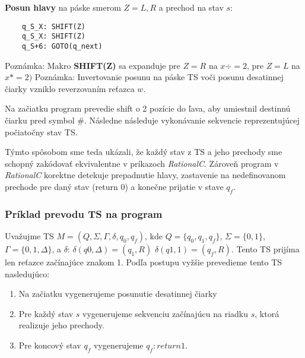 \documentclass[10pt]{article}
\begin{document}
    \textbf{Posun hlavy} na páske smerom $Z = {L,R}$ a prechod na stav $s$:
    \begin{verbatim}
    q_S_X: SHIFT(Z) 
    q_S_X: SHIFT(Z)  
    q_S+6: GOTO(q_next) 
    \end{verbatim}
    Poznámka: Makro \textbf{SHIFT(Z)} sa expanduje pre $Z = R$ na $x \div = 2$, pre $Z = L$ na $x *= 2)$ 
    Poznámka: Invertovanie posunu na páske TS voči posunu desatinnej čiarky vzniklo reverzovaním reťazca $w$.

    Na začiatku program prevedie shift o 2 pozície do ľava, aby umiestnil destinnú čiarku pred
    symbol $\#$. Následne následuje vykonávanie sekvencie reprezentujúcej počiatočny stav TS.

    Týmto spôsobom sme teda ukázali, že každý stav z TS a jeho prechody sme schopný zakódovať
    ekvivalentne v príkazoch \textit{RationalC}. 
    Zároveň program v \textit{RationalC} korektne detekuje prepadnutie hlavy, zastavenie na
    nedefinovanom prechode pre daný stav (return 0) a konečne prijatie v stave $q_f$.
    \subsubsection{Príklad prevodu TS na program}

    Uvažujme TS $M = (Q, \Sigma, \Gamma, \delta, q_0, q_f)$, kde $Q = \{q_0, q_1,q_f\}$, $\Sigma =
    \{0,1\}$, $\Gamma = \{0,1,\Delta\}$, a
    $\delta$: $\delta(q0, \Delta) = (q_1, R)$ $\delta(q1, 1) = (q_f, R)$.
    Tento TS prijíma len reťazce začínajúce znakom 1.
    Podľa postupu vyžšie prevedieme tento TS nasledujúco:
    \begin{enumerate}
        \item Na začiatku vygenerujeme posunutie desatinnej čiarky
        \item Pre každý stav $s$ vygenerujeme sekvenciu začínajúcu na riadku $s$, ktorá realizuje jeho prechody.
        \item Pre koncový stav $q_f$ vygenerujeme $q_f: return 1$.
    \end{enumerate}
\end{document}
